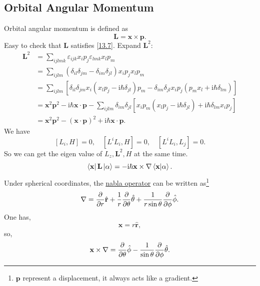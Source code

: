\documentclass{article}
\theoremstyle{1}
\newcommand{\ii}{\mathrm{i}}
\begin{document}
\subsection{Orbital Angular Momentum}
Orbital angular momentum is defined as
\begin{equation}
    \mathbf{L}=\mathbf{x}\times \mathbf{p}.
\end{equation}
Easy to check that $\mathbf{L}$ satisfies \eqref{13.7}.
Expand $\mathbf{L}^2$:
\begin{equation}\label{13.11}
\begin{aligned}
\mathbf{L}^2 &= \sum_{ijlmk} \varepsilon_{ijk}x_i p_j \varepsilon_{lmk}x_l p_m \\
&= \sum_{ijlm} (\delta_{il}\delta_{jm} - \delta_{im}\delta_{jl})x_i p_j x_l p_m \\
&= \sum_{ijlm} [\delta_{il}\delta_{jm}x_i (x_l p_j - \ii\hbar\delta_{jl})p_m - \delta_{im}\delta_{jl}x_i p_j(p_m x_l + \ii\hbar\delta_{lm})]  \\
&= \mathbf{x}^2 \mathbf{p}^2 - \ii\hbar \mathbf{x} \cdot \mathbf{p} - \sum_{ijlm} \delta_{im}\delta_{jl}[x_i p_m(x_l p_j - \ii\hbar\delta_{jl}) + \ii\hbar\delta_{lm}x_i p_j] \\
&= \mathbf{x}^2 \mathbf{p}^2 - (\mathbf{x} \cdot \mathbf{p})^2 + \ii\hbar \mathbf{x} \cdot \mathbf{p}.
\end{aligned}
\end{equation}
We have 
\begin{equation}
    \left[L_i,H\right]=0,\quad \left[L^iL_i,H\right]=0,\quad \left[L^iL_i,L_j\right]=0.
\end{equation}
So we can get the eigen value of $L_z, \mathbf{L}^2, H$ at the same time.
\begin{equation}
    \bra{\mathbf{x}}\mathbf{L}\ket{\alpha}=-\ii \hbar \mathbf{x}\times\nabla\braket{\mathbf{x}}{\alpha}.
\end{equation}
Under spherical coordinates, the \href{run:Nabla Operator.pdf alias}{nabla operator} can be written as\footnote{$\mathbf{p}$ represent a displacement, it always acts like a gradient.}
\begin{equation}
    \nabla=\pdv{r}\hat{\mathbf{r}}+\frac{1}{r}\pdv{\theta}\hat{\mathbf{\theta}}+\frac{1}{r\sin\theta}\pdv{\phi}\hat{\mathbf{\phi}}.
\end{equation}
One has,
\begin{equation}
    \mathbf{x}=r \hat{\mathbf{r}},
\end{equation}
so, 
\begin{equation}
    \mathbf{x}\times\nabla=\pdv{\theta}\hat{\mathbf{\phi}}-\frac{1}{\sin\theta}\pdv{\phi}\hat{\mathbf{\theta}}.
\end{equation}
\end{document}
